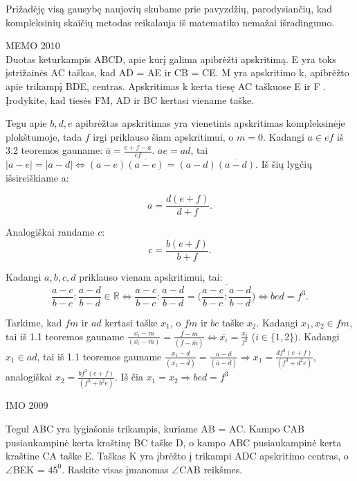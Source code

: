 Prižadėję visą gausybę naujovių skubame prie pavyzdžių, parodysiančių, kad
kompleksinių skaičių metodas reikalauja iš matematiko nemažai išradingumo.


\begin{pavnr} 
 MEMO 2010 
\\
Duotas keturkampis ABCD, apie kurį galima apibrėžti apskritimą. E yra toks įstrižainės AC
taškas, kad AD = AE ir CB = CE. M yra apskritimo k, apibrėžto apie trikampį BDE,
centras. Apskritimas k kerta tiesę AC taškuose E ir F . Įrodykite, kad tiesės FM, AD ir BC
kertasi viename taške.
\end{pavnr}
\begin{sprendimas}


Tegu apie $b, d, e$ apibrėžtas apskritimas yra vienetinis apskritimas kompleksinėje plokštumoje, tada $f$ irgi priklauso šiam apskritimui, o $m=0$. Kadangi $a\in ef$ iš 3.2 teoremos gauname: $\overline{a}=\frac{e+f-a}{ef}$. $ae = ad$, tai $|a-e|=|a-d| \Leftrightarrow (a-e)\overline{(a-e)}=(a-d)\overline{(a-d)}$. Iš šių lygčių išsireiškiame a:

\begin{equation*}
a=\frac{d(e+f)}{d+f}.
\end{equation*}

Analogiškai randame $c$:
\begin{equation*}
c=\frac{b(e+f)}{b+f}.
\end{equation*}

Kadangi $a,b,c,d$ priklauso vienam apskritimui, tai:
\begin{equation*}
\frac{a-c}{b-c}:\frac{a-d}{b-d}\in \mathbb{R} \Leftrightarrow \frac{a-c}{b-c}:\frac{a-d}{b-d}= \overline{\bigg(\frac{a-c}{b-c}:\frac{a-d}{b-d}\bigg)} \Leftrightarrow bed=f^3.
\end{equation*}

Tarkime, kad $ fm$ ir $ad$ kertasi taške $x_1$, o $fm$ ir $bc$ taške $x_2$. Kadangi $x_1, x_2 \in fm$, tai iš 1.1 teoremos gauname $\frac{x_i-m}{(\overline{x_i}-\overline{m})}=\frac{f-m}{(\overline{f}-\overline{m})} \Leftrightarrow          \overline{x_i}=\frac{x_i}{f^2}$ ($i \in \{1, 2\})$.
Kadangi $x_1 \in ad$, tai iš 1.1 teoremos gauname $\frac{x_1-d}{(\overline{x_1}-\overline{d})}=\frac{a-d}{(\overline{a}-\overline{d})} \Rightarrow x_1=\frac{df^2(e+f)}{(f^3+d^2e)}$,
analogiškai $x_2=\frac{bf^2(e+f)}{(f^3+b^2e)}$.
Iš čia $x_1=x_2 \Rightarrow bed=f^3$
\end{sprendimas}
\begin{pavnr}

IMO 2009

Tegul ABC yra lygiašonis trikampis, kuriame AB =
AC. Kampo CAB pusiaukampinė kerta kraštinę BC taške D, o kampo
ABC pusiaukampinė kerta kraštine CA taške E. Taškas K yra įbrėžto
į trikampi ADC apskritimo centras, o $\angle$BEK = $45^0$. Raskite visas
įmanomas $\angle$CAB reikšmes.
\end{pavnr}
